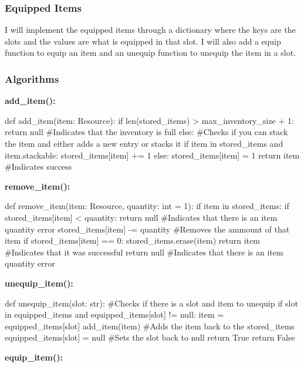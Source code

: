 \documentclass{article}
\begin{document}
        \subsubsection{Equipped Items}
        I will implement the equipped items through a dictionary where the keys are the slots and the values are what is equipped in that slot. I will also add a equip function to equip an item and an unequip function to unequip the item in a slot.\\
        \subsubsection{Algorithms}
        \textbf{add\_item():}\\
        \begin{python}
def add_item(item: Resource):
   if len(stored_items) > max_inventory_size + 1:
      return null #Indicates that the inventory is full
   else:
      #Checks if you can stack the item and either adds a new entry or stacks it
         if item in stored_items and item.stackable:
            stored_items[item] += 1
         else:
            stored_items[item] = 1
   return item #Indicates success
        \end{python}
        \textbf{remove\_item():}\\
        \begin{python}
def remove_item(item: Resource, quantity: int = 1):
   if item in stored_items:
      if stored_items[item] < quantity:
         return null #Indicates that there is an item quantity error
      stored_items[item] -= quantity #Removes the ammount of that item
      if stored_items[item] == 0:
         stored_items.erase(item)
      return item #Indicates that it was successful
   return null #Indicates that there is an item quantity error
        
        \end{python}
        \textbf{unequip\_item():}\\
        \begin{python}
def unequip_item(slot: str):
   #Checks if there is a slot and item to unequip
   if slot in equipped_items and equipped_items[slot] != null:
      item = equipped_items[slot]
      add_item(item) #Adds the item back to the stored_items
      equipped_items[slot] = null #Sets the slot back to null
      return True
   return False
        \end{python}
        \newpage
        \textbf{equip\_item():}\\
\end{document}
